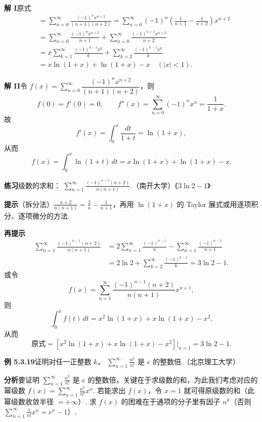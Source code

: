 \documentclass[UTF8, 12pt, fontset=fandol, oneside]{ctexart}
\begin{document}
\noindent\textbf{解 I}\quad 原式
\[
\begin{aligned}
&=\sum_{n=0}^{\infty}\frac{(-1)^nx^{n+2}}{(n+1)(n+2)}
=\sum_{n=0}^{\infty}(-1)^n\left(\frac1{n+1}-\frac1{n+2}\right)x^{n+2}\\
&=\sum_{n=0}^{\infty}\frac{(-1)^nx^{n+2}}{n+1}
+\sum_{n=0}^{\infty}\frac{(-1)^{n+1}x^{n+2}}{n+2}\\
&=x\sum_{k=1}^{\infty}\frac{(-1)^{k-1}x^k}{k}
+\sum_{k=2}^{\infty}\frac{(-1)^{k-1}x^k}{k}\\
&=x\ln(1+x)+\ln(1+x)-x\quad(|x|<1).
\end{aligned}
\]

\noindent\textbf{解 II}\quad 令
$f(x)=\displaystyle\sum_{n=0}^{\infty}\dfrac{(-1)^nx^{n+2}}{(n+1)(n+2)}$，则
\[
  f(0)=f'(0)=0,\qquad f''(x)=\sum_{n=0}^{\infty}(-1)^nx^n=\frac1{1+x}.
\]
故
\[
  f'(x)=\int_0^x\frac{dt}{1+t}=\ln(1+x),
\]
从而
\[
  f(x)=\int_0^x\ln(1+t)\,dt=x\ln(1+x)+\ln(1+x)-x.
\]

\noindent\textbf{练习}\quad 级数的求和：
$\displaystyle\sum_{n=1}^{\infty}\frac{(-1)^{n-1}(n+2)}{n(n+1)}$.（南开大学）\hfill《$3\ln2-1$》

\noindent\textbf{提示}\quad （拆分法）$\displaystyle\frac{n+2}{n(n+1)}=\frac2n-\frac1{n+1}$，再用
$\ln(1+x)$ 的 Taylor 展式或用逐项积分、逐项微分的方法.

\noindent\textbf{再提示}\quad
\[
\begin{aligned}
\sum_{n=1}^{\infty}\frac{(-1)^{n-1}(n+2)}{n(n+1)}
&=2\sum_{n=1}^{\infty}\frac{(-1)^{n-1}}n
-\sum_{n=1}^{\infty}\frac{(-1)^{n-1}}{n+1}\\
&=2\ln2+\sum_{k=2}^{\infty}\frac{(-1)^{k-1}}k
=3\ln2-1.
\end{aligned}
\]
或令
\[
  f(x)=\sum_{n=1}^{\infty}\frac{(-1)^{n-1}(n+2)}{n(n+1)}x^{n+1},
\]
则
\[
  \int_0^x f(t)\,dt=x^2\ln(1+x)+x\ln(1+x)-x^2.
\]
从而
\[
  \text{原式}=\left[x^2\ln(1+x)+x\ln(1+x)-x^2\right]\bigg|_{x=1}=3\ln2-1.
\]

\noindent\textbf{例 5.3.19}\quad 证明对任一正整数 $k$，
$\displaystyle\sum_{n=1}^{\infty}\frac{n^k}{n!}$ 是 $e$ 的整数倍.（北京理工大学）

\noindent\textbf{分析}\quad 要证明 $\displaystyle\sum_{n=1}^{\infty}\frac{n^k}{n!}$ 是 $e$ 的整数倍，关键在于求级数的和，为此我们考虑对应的幂级数
$f(x)=\displaystyle\sum_{n=1}^{\infty}\frac{n^k}{n!}x^n$. 若能求出 $f(x)$，令 $x=1$ 就可得原级数的和（此幂级数收敛半径 $=+\infty$）. 求 $f(x)$ 的困难在于通项的分子里有因子 $n^k$（否则
$\displaystyle\sum_{n=1}^{\infty}\frac1{n!}x^n=e^x-1$）.
\end{document}
